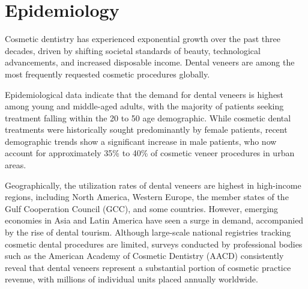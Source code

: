 \section*{Epidemiology}
Cosmetic dentistry has experienced exponential growth over the past three decades, driven by shifting societal standards of beauty, technological advancements, and increased disposable income. Dental veneers are among the most frequently requested cosmetic procedures globally.

Epidemiological data indicate that the demand for dental veneers is highest among young and middle-aged adults, with the majority of patients seeking treatment falling within the 20 to 50 age demographic. While cosmetic dental treatments were historically sought predominantly by female patients, recent demographic trends show a significant increase in male patients, who now account for approximately 35\% to 40\% of cosmetic veneer procedures in urban areas.

Geographically, the utilization rates of dental veneers are highest in high-income regions, including North America, Western Europe, the member states of the Gulf Cooperation Council (GCC), and some countries. However, emerging economies in Asia and Latin America have seen a surge in demand, accompanied by the rise of dental tourism. Although large-scale national registries tracking cosmetic dental procedures are limited, surveys conducted by professional bodies such as the American Academy of Cosmetic Dentistry (AACD) consistently reveal that dental veneers represent a substantial portion of cosmetic practice revenue, with millions of individual units placed annually worldwide.

